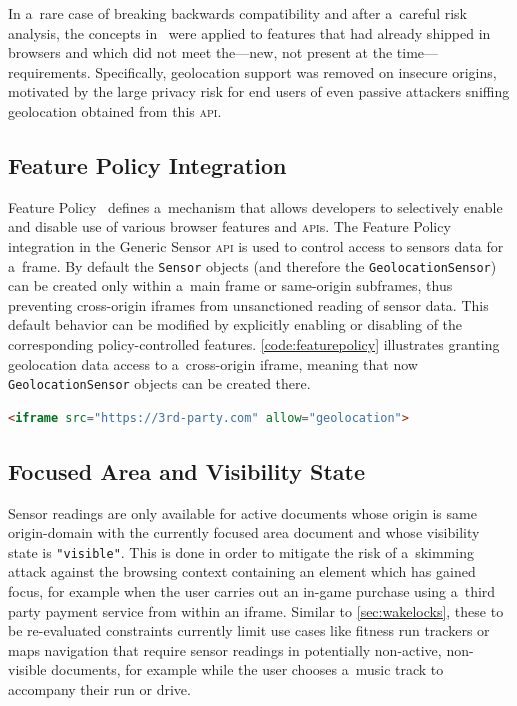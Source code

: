 \documentclass[sigconf,hyphens]{acmart}
\begin{document}
In a~rare case of breaking backwards compatibility and after a~careful risk analysis,
the concepts in~\cite{west2016securecontexts} were applied
to features that had already shipped in browsers
and which did not meet the---new, not present at the time---requirements.
Specifically, geolocation support was removed on insecure origins,
motivated by the large privacy risk for end users of even passive attackers
sniffing geolocation obtained from this \textsc{api}.

\subsection{Feature Policy Integration}

Feature Policy~\cite{clelland2019featurepolicy} defines a~mechanism that allows developers
to selectively enable and disable use of various browser features and \textsc{api}s.
The Feature Policy integration in the Generic Sensor \textsc{api}
is used to control access to sensors data for a~frame.
By default the \texttt{Sensor} objects (and therefore the \texttt{GeolocationSensor})
can be created only within a~main frame or same-origin subframes,
thus preventing cross-origin iframes from unsanctioned reading of sensor data.
This default behavior can be modified by explicitly enabling or disabling
of the corresponding policy-controlled features.
\autoref{code:featurepolicy} illustrates granting geolocation data access to a~cross-origin iframe,
meaning that now \texttt{GeolocationSensor} objects can be created there.

\begin{lstlisting}[caption={Allowing an iframe to use \texttt{GeolocationSensor}},
  label=code:featurepolicy, language=HTML, float=h] 
<iframe src="https://3rd-party.com" allow="geolocation">
\end{lstlisting}

\subsection{Focused Area and Visibility State}
\label{sec:focusandvisibility}

Sensor readings are only available for active documents whose origin is same origin-domain
with the currently focused area document and whose visibility state is \texttt{"visible"}.
This is done in order to mitigate the risk of a~skimming attack
against the browsing context containing an element which has gained focus,
for example when the user carries out an in-game purchase using a~third party payment service
from within an iframe.
Similar to \autoref{sec:wakelocks}, these to be re-evaluated constraints
currently limit use cases like fitness run trackers
or maps navigation that require sensor readings in potentially non-active, non-visible documents,
for example while the user chooses a~music track to accompany their run or drive.
\end{document}

